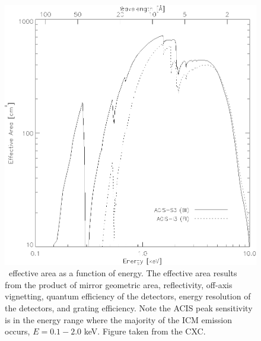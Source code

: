 \begin{figure}[!hp]
  \begin{center}
    \includegraphics*[width=\textwidth, trim=0mm 0mm 0mm 0mm,clip]{effarea}
    \caption[\chandra\ effective area as a function of energy.]{
      \chandra\ effective area as a function of energy. The effective
      area results from the product of mirror geometric area,
      reflectivity, off-axis vignetting, quantum efficiency of the
      detectors, energy resolution of the detectors, and grating
      efficiency. Note the ACIS peak sensitivity is in the energy
      range where the majority of the ICM emission occurs, $E =
      0.1-2.0$ keV. Figure taken from the CXC.}
    \label{fig:effarea}
  \end{center}
\end{figure}
